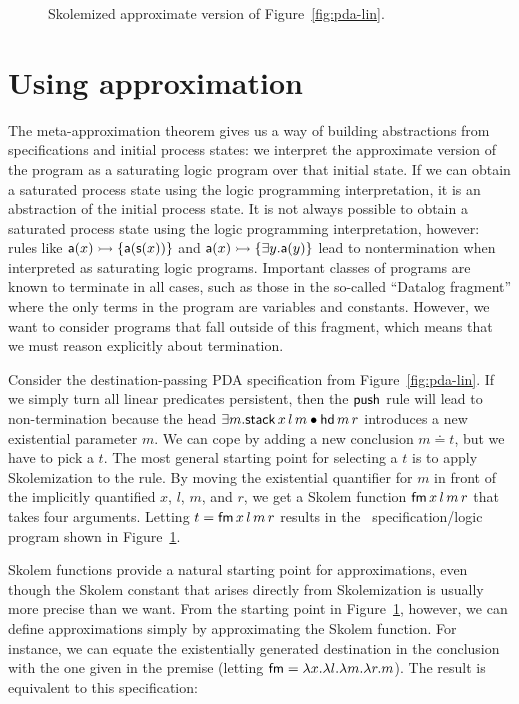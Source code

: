 \begin{figure}
\caption{Skolemized approximate version of Figure~\ref{fig:pda-lin}.}
\label{fig:pda-pers}
\end{figure}



\section{Using approximation}

The meta-approximation theorem gives us a way of building abstractions
from specifications and initial process states: we interpret the
approximate version of the program as a saturating logic program over
that initial state. If we can obtain a saturated process state using
the logic programming interpretation, it is an abstraction of the
initial process state. It is not always possible to obtain a saturated
process state using the logic programming interpretation, however:
rules like ${\sf a}(x) \rightarrowtail \{ {\sf a}({\sf s}(x)) \}$ and ${\sf
  a}(x) \rightarrowtail \{ \exists y. {\sf a}(y) \}$ lead to nontermination
when interpreted as saturating logic programs. Important classes 
of programs are known to terminate in all cases, such as those in the
so-called ``Datalog fragment'' where the only terms in the program
are variables and constants. However, we want to consider programs
that fall outside of this fragment, which means that we must 
reason explicitly about termination.

Consider the destination-passing PDA specification from
Figure~\ref{fig:pda-lin}. If we simply turn all linear predicates
persistent, then the ${\sf push}$ rule will lead to non-termination
because the head $\exists m. {\sf stack}\,x\,l\,m \mathbin{\bullet} {\sf
  hd}\,m\,r$ introduces a new existential parameter $m$. We can cope
by adding a new conclusion $m \doteq t$, but we have to pick a $t$.
The most general starting point for selecting a $t$ is to apply
Skolemization to the rule. By moving the existential quantifier for
$m$ in front of the implicitly quantified $x$, $l$, $m$, and $r$, we
get a Skolem function ${\sf fm}\,x\,l\,m\,r$ that takes four
arguments. Letting $t = {\sf fm}\,x\,l\,m\,r$ results in the
\sls~specification/logic program shown in
Figure~\ref{fig:pda-pers}.

Skolem functions provide a natural starting point for approximations,
even though the Skolem constant that arises directly from
Skolemization is usually more precise than we want. From the starting
point in Figure~\ref{fig:pda-pers}, however, we can define
approximations simply by approximating the Skolem function.  For
instance, we can equate the existentially generated destination in the
conclusion with the one given in the premise (letting ${\sf fm} =
\lambda x. \lambda l. \lambda m. \lambda r. m$). The result is
equivalent to this specification:

